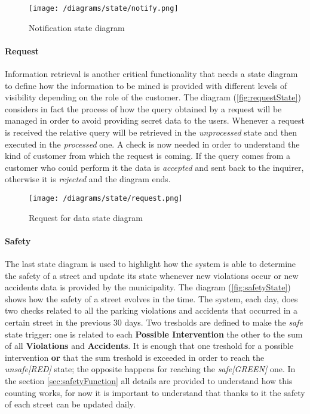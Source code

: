 			\vspace{0.3cm}
			\begin{figure}[h]
				\centering
				\texttt{[image: /diagrams/state/notify.png]}
				\caption{\label{fig:notifyState}Notification state diagram}
			\end{figure}
		
		\paragraph{Request}
			Information retrieval is another critical functionality that needs a state diagram to define how the information to be mined is provided with different levels of visibility depending on the role of the customer. The diagram (\autoref{fig:requestState}) considers in fact the process of how the query obtained by a request will be managed in order to avoid providing secret data to the users. Whenever a request is received the relative query will be retrieved in the \textit{unprocessed} state and then executed in the \textit{processed} one. A check is now needed in order to understand the kind of customer from which the request is coming. If the query comes from a customer who could perform it the data is \textit{accepted} and sent back to the inquirer, otherwise it is \textit{rejected} and the diagram ends.
			
			\vspace{0.3cm}
			\begin{figure}[h]
				\centering
				\texttt{[image: /diagrams/state/request.png]}
				\caption{\label{fig:requestState}Request for data state diagram}
			\end{figure}
		
		\paragraph{Safety}
			The last state diagram is used to highlight how the system is able to determine the safety of a street and update its state whenever new violations occur or new accidents data is provided by the municipality. The diagram (\autoref{fig:safetyState}) shows how the safety of a street evolves in the time. The system, each day, does two checks related to all the parking violations and accidents that occurred in a certain street in the previous 30 days. Two tresholds are defined to make the \textit{safe} state trigger: one is related to each \textbf{Possible Intervention} the other to the sum of all \textbf{Violations} and \textbf{Accidents}. It is enough that one treshold for a possible intervention \textbf{or} that the sum treshold is exceeded in order to reach the \textit{unsafe[RED]} state; the opposite happens for reaching the \textit{safe[GREEN]} one. In the section \ref{sec:safetyFunction} all details are provided to understand how this counting works, for now it is important to understand that thanks to it the safety of each street can be updated daily.
			
